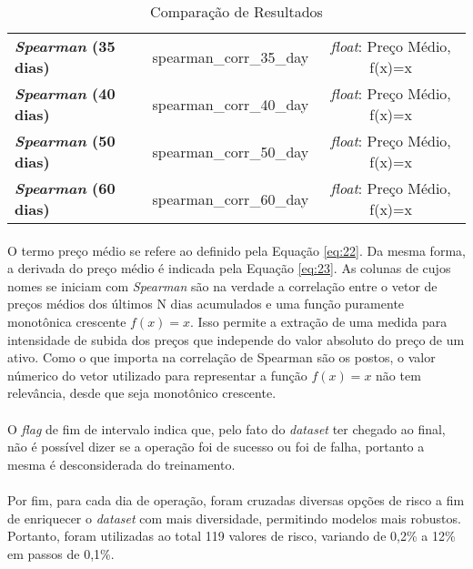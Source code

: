 \begin{table}[h!]
\begin{center}
\begin{tabular}{ l|c|c }
            \textbf{\textit{Spearman} (35 dias)} & spearman\_corr\_35\_day & \textit{float}: Preço Médio, f(x)=x \\
            \textbf{\textit{Spearman} (40 dias)} & spearman\_corr\_40\_day & \textit{float}: Preço Médio, f(x)=x \\
            \textbf{\textit{Spearman} (50 dias)} & spearman\_corr\_50\_day & \textit{float}: Preço Médio, f(x)=x \\
            \textbf{\textit{Spearman} (60 dias)} & spearman\_corr\_60\_day & \textit{float}: Preço Médio, f(x)=x \\
        \end{tabular}
        \caption{Comparação de Resultados}
        \label{tab:7}
    \end{center}
\end{table}

\paragraph{} O termo preço médio se refere ao definido pela Equação \ref{eq:22}. Da mesma forma, a derivada do preço médio é indicada pela Equação \ref{eq:23}. As colunas de cujos nomes se iniciam com \textit{Spearman} são na verdade a correlação entre o vetor de preços médios dos últimos N dias acumulados e uma função puramente monotônica crescente \begin{math} f(x) = x \end{math}. Isso permite a extração de uma medida para intensidade de subida dos preços que independe do valor absoluto do preço de um ativo. Como o que importa na correlação de Spearman são os postos, o valor númerico do vetor utilizado para representar a função \begin{math} f(x) = x \end{math} não tem relevância, desde que seja monotônico crescente.

\paragraph{} O \textit{flag} de fim de intervalo indica que, pelo fato do \textit{dataset} ter chegado ao final, não é possível dizer se a operação foi de sucesso ou foi de falha, portanto a mesma é desconsiderada do treinamento.

\paragraph{} Por fim, para cada dia de operação, foram cruzadas diversas opções de risco a fim de enriquecer o \textit{dataset} com mais diversidade, permitindo modelos mais robustos. Portanto, foram utilizadas ao total 119 valores de risco, variando de 0,2\% a 12\% em passos de 0,1\%.



